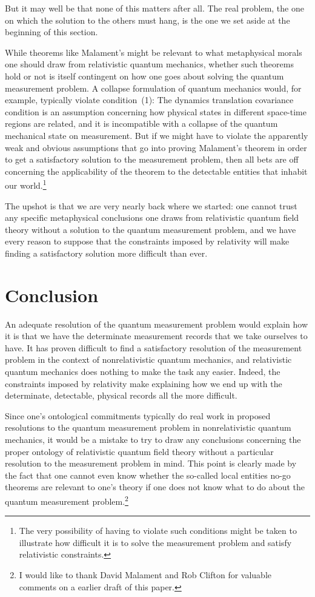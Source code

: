 \documentclass [12pt]{article}
\begin{document}
But it may well be that none of this matters after all.  The real problem,
the one on which the solution to the others must hang, is the one we set aside
at the beginning of this section.

While theorems like Malament's might be relevant
to what metaphysical morals one should draw from relativistic quantum mechanics,
whether such theorems hold or not is itself contingent on how one goes about
solving the quantum measurement problem.  A collapse formulation of quantum
mechanics would, for example, typically violate condition~(1): The dynamics
translation covariance condition is an assumption concerning how
physical states in different space-time regions are related, and
it is incompatible with a collapse of the quantum mechanical state
on measurement.  But if we might have to violate the apparently
weak and obvious assumptions that go into proving Malament's theorem in
order to get a satisfactory solution to the measurement problem, then 
all bets are off concerning the applicability of the theorem to the
detectable entities that inhabit our world.\footnote{The very possibility of
having to violate such conditions might be taken to illustrate how difficult it is
to solve the measurement problem and satisfy relativistic constraints.}

The upshot is that we are very nearly back where we started: one cannot
trust any specific metaphysical conclusions one draws from relativistic quantum
field theory without a solution to the quantum measurement problem, and
we have every reason to suppose that the constraints imposed by relativity
will make finding a satisfactory solution more difficult than ever.


\section{Conclusion}



An adequate resolution of the quantum measurement problem would explain
how it is that we have the determinate measurement records that
we take ourselves to have.  It has proven difficult to find a satisfactory
resolution of the measurement problem in 
the context of nonrelativistic quantum mechanics, and relativistic
quantum mechanics does nothing to make the task any easier.  Indeed,
the constraints imposed by relativity make explaining how we end up
with the determinate, detectable, physical records all the more difficult.


Since one's ontological commitments typically do real work in proposed resolutions
to the quantum measurement problem in nonrelativistic quantum mechanics,
it would be a mistake to try to draw any conclusions
concerning the proper ontology of relativistic quantum field theory
without a particular resolution to the measurement problem in mind.  This point
is clearly made by the fact that one cannot even know whether the so-called
local entities no-go theorems are relevant to one's theory if one does not
know what to do about the quantum measurement problem.\footnote{I would like to thank
David Malament and Rob Clifton for valuable comments on a earlier draft of this paper.}
\end{document}

